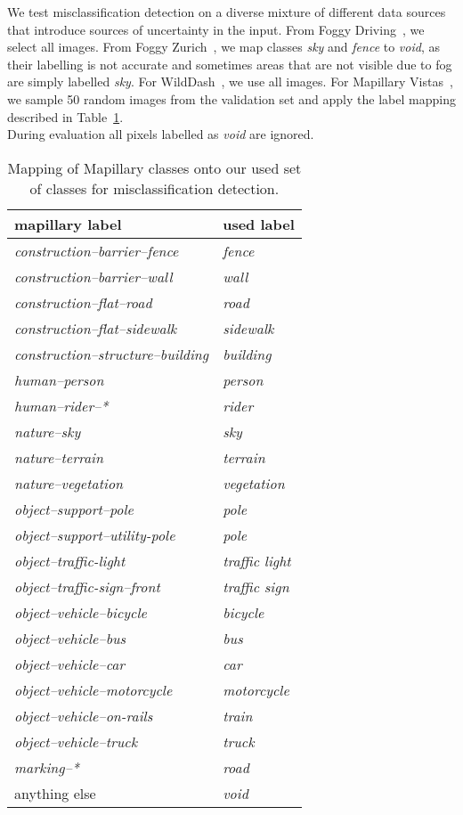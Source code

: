  We test misclassification detection on a diverse mixture of different data sources that introduce sources of uncertainty in the input. From Foggy Driving~\cite{foggycityscapes1}, we select all images. From Foggy Zurich~\cite{foggycityscapes2}, we map classes \emph{sky} and \emph{fence} to \emph{void}, as their labelling is not accurate and sometimes areas that are not visible due to fog are simply labelled \emph{sky}. For WildDash~\cite{Zendel2018-ru}, we use all images. For Mapillary Vistas~\cite{Neuhold2017-ca}, we sample 50 random images from the validation set and apply the label mapping described in Table~\ref{tab:mapillary}.\\
During evaluation all pixels labelled as \emph{void} are ignored.

\begin{table}[ht]
\centering
\footnotesize
\begin{tabular}{ll}
\toprule
mapillary label & used label\\
\midrule
\emph{construction--barrier--fence} & \emph{fence}\\
\emph{construction--barrier--wall} & \emph{wall}\\
\emph{construction--flat--road} & \emph{road}\\
\emph{construction--flat--sidewalk} & \emph{sidewalk}\\
\emph{construction--structure--building} & \emph{building}\\
\emph{human--person} & \emph{person}\\
\emph{human--rider--*} & \emph{rider}\\
\emph{nature--sky} & \emph{sky}\\
\emph{nature--terrain} & \emph{terrain}\\
\emph{nature--vegetation} & \emph{vegetation}\\
\emph{object--support--pole} & \emph{pole}\\
\emph{object--support--utility-pole} & \emph{pole}\\
\emph{object--traffic-light} & \emph{traffic light}\\
\emph{object--traffic-sign--front} & \emph{traffic sign}\\
\emph{object--vehicle--bicycle} & \emph{bicycle}\\
\emph{object--vehicle--bus} & \emph{bus}\\
\emph{object--vehicle--car} & \emph{car}\\
\emph{object--vehicle--motorcycle} & \emph{motorcycle}\\
\emph{object--vehicle--on-rails} & \emph{train}\\
\emph{object--vehicle--truck} & \emph{truck}\\
\emph{marking--*} & \emph{road}\\
anything else & \emph{void}\\
\bottomrule
\end{tabular}
\vspace{3mm}
\caption{Mapping of Mapillary classes onto our used set of classes for misclassification detection.}
\label{tab:mapillary}
\end{table}

